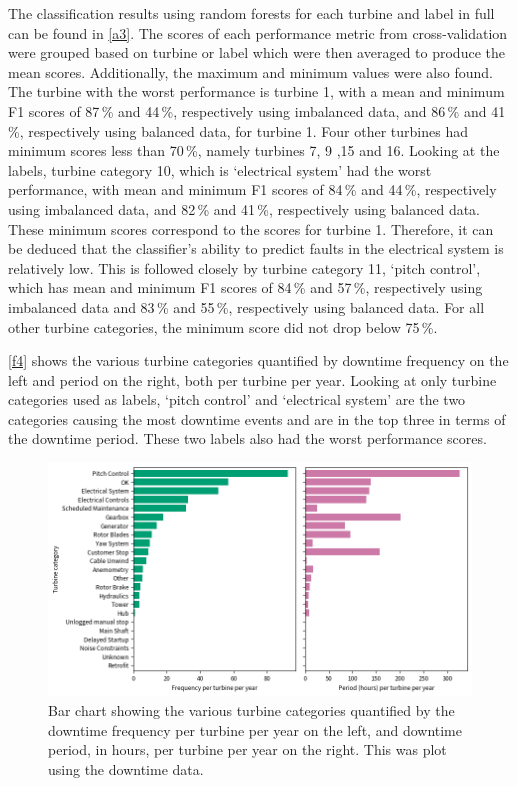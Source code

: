 The classification results using random forests for each turbine and label in
full can be found in \autoref{a3}. The scores of each performance metric from
cross-validation were grouped based on turbine or label which were then
averaged to produce the mean scores. Additionally, the maximum and minimum
values were also found. The turbine with the worst performance is turbine 1,
with a mean and minimum F1 scores of 87\,\% and 44\,\%, respectively using
imbalanced data, and 86\,\% and 41\,\%, respectively using balanced data, for
turbine 1. Four other turbines had minimum scores less than 70\,\%, namely
turbines 7, 9 ,15 and 16. Looking at the labels, turbine category 10, which is
`electrical system' had the worst performance, with mean and minimum F1 scores
of 84\,\% and 44\,\%, respectively using imbalanced data, and 82\,\% and
41\,\%, respectively using balanced data. These minimum scores correspond to
the scores for turbine 1. Therefore, it can be deduced that the classifier's
ability to predict faults in the electrical system is relatively low. This is
followed closely by turbine category 11, `pitch control', which has mean and
minimum F1 scores of 84\,\% and 57\,\%, respectively using imbalanced data and
83\,\% and 55\,\%, respectively using balanced data. For all other turbine
categories, the minimum score did not drop below 75\,\%.

\autoref{f4} shows the various turbine categories quantified by downtime
frequency on the left and period on the right, both per turbine per year.
Looking at only turbine categories used as labels, `pitch control' and
`electrical system' are the two categories causing the most downtime events
and are in the top three in terms of the downtime period. These two labels
also had the worst performance scores.

\begin{figure}
  \centering
  \includegraphics[width=\textwidth]{../images/f4}
  \caption{\label{f4}Bar chart showing the various turbine categories
  quantified by the downtime frequency per turbine per year on the left, and
  downtime period, in hours, per turbine per year on the right. This was plot
  using the downtime data.}
\end{figure}

